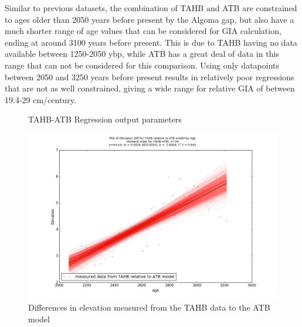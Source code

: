 Similar to previous datasets, the combination of TAHB and ATB are constrained to
ages older than
2050 years before present by the Algoma gap, but also have a much shorter range
of age values that
can be considered for GIA calculation, ending at around 3100 years before present.
This is due to TAHB having no data available between 1250-2050 ybp, while ATB
has a great deal of data in this range that can not be considered for this
comparison.
Using only datapoints between 2050 and 3250 years before present results in
relatively poor regressions that are not as well constrained, giving a wide range for
relative GIA of between 19.4-29 cm/century. \\


\begin{figure}[H]
	\begin{flushleft}
	\end{flushleft}
	\caption{TAHB-ATB Regression output parameters}
	\label{fig:TAHBxATB_regression}
\end{figure}


\newpage

\begin{figure}[H]
	\includegraphics[width=0.9\linewidth]{data/bothNonZero/withinSeventyFivePercent/gias/theGIA_TAHB_relative_to_ATB.png}
	\caption{Differences in elevation measured from the TAHB data to the ATB model}
	\label{fig:gias_TAHBxATB}
\end{figure}
\newpage


